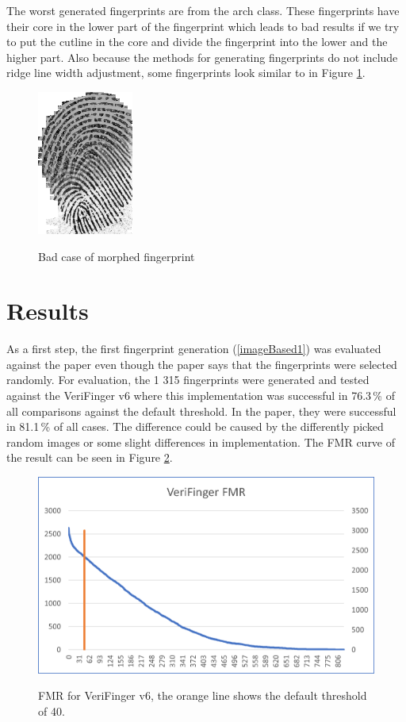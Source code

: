 The worst generated fingerprints are from the arch class. These fingerprints have their core in the lower part of the fingerprint which leads to bad results if we try to put the cutline in the core and divide the fingerprint into the lower and the higher part. Also because the methods for generating fingerprints do not include ridge line width adjustment, some fingerprints look similar to in Figure \ref{fig:ridgebad}.

\begin{figure}[H]
    \centering
        {\includegraphics[width=0.25\linewidth]{obrazky-figures/ridgebad.png}}\\
        \caption{Bad case of morphed fingerprint}
        \label{fig:ridgebad}
\end{figure}

\section{Results}
\label{Results}
As a first step, the first fingerprint generation (\ref{imageBased1}) was evaluated against the paper \cite{morphing_paper} even though the paper says that the fingerprints were selected randomly. For evaluation, the 1 315 fingerprints were generated and tested against the VeriFinger v6 where this implementation was successful in 76.3\,\% of all comparisons against the default threshold. In the paper, they were successful in 81.1\,\% of all cases. The difference could be caused by the differently picked random images or some slight differences in implementation. The FMR curve of the result can be seen in Figure \ref{fig:verifingerv6FAR}.

\begin{figure}[H]
    \centering
        {\includegraphics[width=0.8\linewidth]{obrazky-figures/verifingerv6FAR.png}}\\
        \caption{FMR for VeriFinger v6, the orange line shows the default threshold of 40.}
        \label{fig:verifingerv6FAR}
\end{figure}

